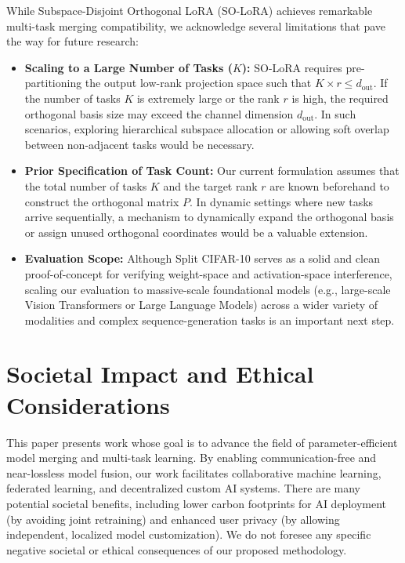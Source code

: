 \documentclass{article}
\theoremstyle{plain}
\theoremstyle{definition}
\theoremstyle{remark}
\begin{document}
While Subspace-Disjoint Orthogonal LoRA (SO-LoRA) achieves remarkable multi-task merging compatibility, we acknowledge several limitations that pave the way for future research:
\begin{itemize}
    \item \textbf{Scaling to a Large Number of Tasks ($K$):} SO-LoRA requires pre-partitioning the output low-rank projection space such that $K \times r \le d_{\text{out}}$. If the number of tasks $K$ is extremely large or the rank $r$ is high, the required orthogonal basis size may exceed the channel dimension $d_{\text{out}}$. In such scenarios, exploring hierarchical subspace allocation or allowing soft overlap between non-adjacent tasks would be necessary.
    \item \textbf{Prior Specification of Task Count:} Our current formulation assumes that the total number of tasks $K$ and the target rank $r$ are known beforehand to construct the orthogonal matrix $P$. In dynamic settings where new tasks arrive sequentially, a mechanism to dynamically expand the orthogonal basis or assign unused orthogonal coordinates would be a valuable extension.
    \item \textbf{Evaluation Scope:} Although Split CIFAR-10 serves as a solid and clean proof-of-concept for verifying weight-space and activation-space interference, scaling our evaluation to massive-scale foundational models (e.g., large-scale Vision Transformers or Large Language Models) across a wider variety of modalities and complex sequence-generation tasks is an important next step.
\end{itemize}

\section{Societal Impact and Ethical Considerations}
\label{impact}

This paper presents work whose goal is to advance the field of parameter-efficient model merging and multi-task learning. By enabling communication-free and near-lossless model fusion, our work facilitates collaborative machine learning, federated learning, and decentralized custom AI systems. There are many potential societal benefits, including lower carbon footprints for AI deployment (by avoiding joint retraining) and enhanced user privacy (by allowing independent, localized model customization). We do not foresee any specific negative societal or ethical consequences of our proposed methodology.
\end{document}
